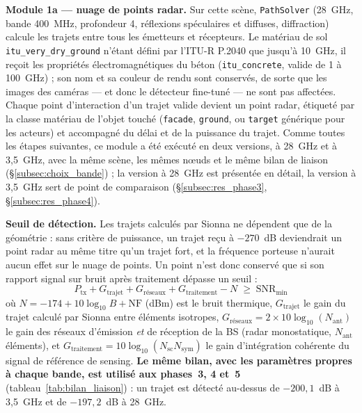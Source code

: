 \documentclass[12pt,a4paper,titlepage]{article}
\begin{document}
\textbf{Module 1a --- nuage de points radar.} Sur cette scène, \texttt{PathSolver} (28~GHz, bande 400~MHz, profondeur 4, réflexions spéculaires et diffuses, diffraction) calcule les trajets entre tous les émetteurs et récepteurs. Le matériau de sol \texttt{itu\_very\_dry\_ground} n'étant défini par l'ITU-R P.2040 que jusqu'à 10~GHz, il reçoit les propriétés électromagnétiques du béton (\texttt{itu\_concrete}, valide de 1 à 100~GHz) ; son nom et sa couleur de rendu sont conservés, de sorte que les images des caméras --- et donc le détecteur fine-tuné --- ne sont pas affectées. Chaque point d'interaction d'un trajet valide devient un point radar, étiqueté par la classe matériau de l'objet touché (\texttt{facade}, \texttt{ground}, ou \texttt{target} générique pour les acteurs) et accompagné du délai et de la puissance du trajet. Comme toutes les étapes suivantes, ce module a été exécuté en deux versions, à 28~GHz et à 3,5~GHz, avec la même scène, les mêmes n\oe uds et le même bilan de liaison (\S\ref{subsec:choix_bande}) ; la version à 28~GHz est présentée en détail, la version à 3,5~GHz sert de point de comparaison (\S\ref{subsec:res_phase3}, \S\ref{subsec:res_phase4}).

\textbf{Seuil de détection.} Les trajets calculés par Sionna ne dépendent que de la géométrie : sans critère de puissance, un trajet reçu à $-270$~dB deviendrait un point radar au même titre qu'un trajet fort, et la fréquence porteuse n'aurait aucun effet sur le nuage de points. Un point n'est donc conservé que si son rapport signal sur bruit après traitement dépasse un seuil :
\begin{equation}
    P_{\mathrm{tx}} + G_{\mathrm{trajet}} + G_{\mathrm{réseaux}} + G_{\mathrm{traitement}} - N \;\geq\; \mathrm{SNR}_{\min}
    \label{eq:seuil_detection}
\end{equation}
où $N = -174 + 10\log_{10} B + \mathrm{NF}$ (dBm) est le bruit thermique, $G_{\mathrm{trajet}}$ le gain du trajet calculé par Sionna entre éléments isotropes, $G_{\mathrm{réseaux}} = 2 \times 10\log_{10}(N_{\mathrm{ant}})$ le gain des réseaux d'émission \emph{et} de réception de la BS (radar monostatique, $N_{\mathrm{ant}}$ éléments), et $G_{\mathrm{traitement}} = 10\log_{10}(N_{\mathrm{sc}} N_{\mathrm{sym}})$ le gain d'intégration cohérente du signal de référence de sensing. \textbf{Le même bilan, avec les paramètres propres à chaque bande, est utilisé aux phases~3, 4 et~5} (tableau~\ref{tab:bilan_liaison}) : un trajet est détecté au-dessus de $-200{,}1$~dB à 3,5~GHz et de $-197{,}2$~dB à 28~GHz.
\end{document}
